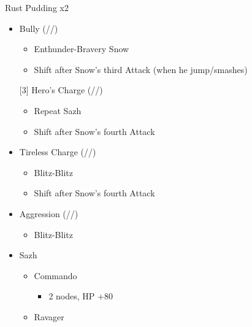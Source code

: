 \renewcommand{\first}{[1] }
\renewcommand{\second}{[2] Devastation (\com/\sab/\com)}
\renewcommand{\third}{[3] Hero's Charge (\syn/\med/\com)}
\renewcommand{\fourth}{[4] Tireless Charge (\com/\med/\com)}
\renewcommand{\fifth}{[5] Bully (\syn/\sab/\com)}
\renewcommand{\sixth}{[6] Aggression (\com/\rav/\com)}
\newpage
\begin{multicols}{2}
	\begin{battle}[0:24]{Rust Pudding x2}
		\begin{itemize}
			\item \fifth
			      \begin{itemize}
				      \item Enthunder-Bravery Snow
				      \item Shift after Snow's third Attack (when he jump/smashes)
			      \end{itemize}
			      \third
			      \begin{itemize}
				      \item Repeat Sazh
				      \item Shift after Snow's fourth Attack
			      \end{itemize}
			\item \fourth
			      \begin{itemize}
				      \item Blitz-Blitz
				      \item Shift after Snow's fourth Attack
			      \end{itemize}
			\item \sixth
			      \begin{itemize}
				      \item Blitz-Blitz
			      \end{itemize}
		\end{itemize}
	\end{battle}
	\begin{menu}
		\begin{itemize}
			\crystarium
			\begin{itemize}
				\item Sazh
				      \begin{itemize}
					      \item Commando
					            \begin{itemize}
						            \item 2 nodes, HP +80
					            \end{itemize}
					      \item Ravager
					            \begin{itemize}

\end{itemize}
\end{itemize}
\end{itemize}
\end{itemize}
\end{menu}
\end{multicols}
